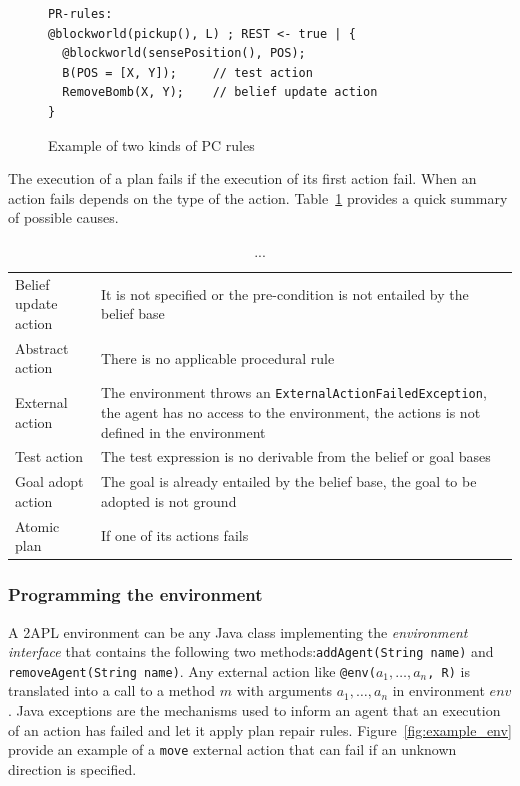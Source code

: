 \documentclass[a4paper]{article}
\begin{document}
\begin{figure}[htp]
\begin{verbatim}
PR-rules:
@blockworld(pickup(), L) ; REST <- true | { 
  @blockworld(sensePosition(), POS);
  B(POS = [X, Y]);     // test action	
  RemoveBomb(X, Y);    // belief update action
}
\end{verbatim}
\caption{Example of two kinds of PC rules}
\label{fig:example_pcrules}
\end{figure}

The execution of a plan fails if the execution of its first action fail. When an action fails depends on the type of the action. Table~\ref{table:action_fail} provides a quick summary of possible causes.

\begin{table}[htp]
  \begin{tabular}{l l}
  Belief update action & It is not specified or the pre-condition is not entailed by the belief base  \\
  Abstract action & There is no applicable procedural rule \\
  External action & The environment throws an \texttt{ExternalActionFailedException}, the agent has no access to the environment, the actions is not defined in the environment \\
  Test action & The test expression is no derivable from the belief or goal bases \\
  Goal adopt action & The goal is already entailed by the belief base, the goal to be adopted is not ground\\
  Atomic plan & If one of its actions fails
  \end{tabular}
  \caption{...}
  \label{table:action_fail}
\end{table}

\subsubsection{Programming the environment} %

A 2APL environment can be any Java class implementing the \emph{environment interface} that contains the following two methods:\texttt{addAgent(String name)} and \texttt{removeAgent(String name)}. Any external action like \texttt{@env($a_1, \ldots, a_n$, R)} is translated into a call to a method $m$ with arguments $a_1, \ldots, a_n$ in environment $env$. Java exceptions are the mechanisms used to inform an agent that an execution of an action has failed and let it apply plan repair rules. Figure~\ref{fig:example_env} provide an example of a \texttt{move} external action that can fail if an unknown direction is specified.
\end{document}
